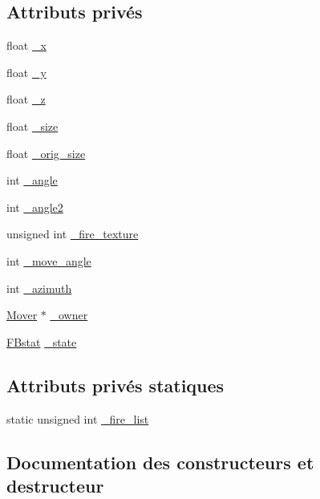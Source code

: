 \subsection*{Attributs privés}
\begin{DoxyCompactItemize}
\item 
float \hyperlink{classFireBall_a9a46f5228bf2355bf96fea4da3a128a4}{\+\_\+x}
\item 
float \hyperlink{classFireBall_a3fed1ac38e9869a78a8decc3cb926120}{\+\_\+y}
\item 
float \hyperlink{classFireBall_abed9b335d2b3b4973de5bdc959acf936}{\+\_\+z}
\item 
float \hyperlink{classFireBall_a253cdbc7239a040eb3f572755e39f6bb}{\+\_\+size}
\item 
float \hyperlink{classFireBall_a4b2963b8591d733b64cfeab4d9d3c93c}{\+\_\+orig\+\_\+size}
\item 
int \hyperlink{classFireBall_a1cdea956c46b320ca763cc7a64cce8c0}{\+\_\+angle}
\item 
int \hyperlink{classFireBall_aa63dd4d75e485c53d9680864425936e8}{\+\_\+angle2}
\item 
unsigned int \hyperlink{classFireBall_a1e499397046bd22deb00a2d22778050b}{\+\_\+fire\+\_\+texture}
\item 
int \hyperlink{classFireBall_a8fc20dd0a5c2644934b9fa06d4477058}{\+\_\+move\+\_\+angle}
\item 
int \hyperlink{classFireBall_a96acfc046f1b383f513555876006ba60}{\+\_\+azimuth}
\item 
\hyperlink{classMover}{Mover} $\ast$ \hyperlink{classFireBall_a60bc9440298c39634a008d29f14e275e}{\+\_\+owner}
\item 
\hyperlink{FireBall_8h_a2e35d0e49f81f5c176ab1cf919b28cfc}{F\+Bstat} \hyperlink{classFireBall_a92dcb86f4fd59baedd22d782612f55a1}{\+\_\+state}
\end{DoxyCompactItemize}
\subsection*{Attributs privés statiques}
\begin{DoxyCompactItemize}
\item 
static unsigned int \hyperlink{classFireBall_ae0ec8e0bbb72db07447ba849e247077d}{\+\_\+fire\+\_\+list}
\end{DoxyCompactItemize}


\subsection{Documentation des constructeurs et destructeur}
\mbox{\label{classFireBall_a3b38dd5ab1ab31c60b2f50366c1b9f74}} 

